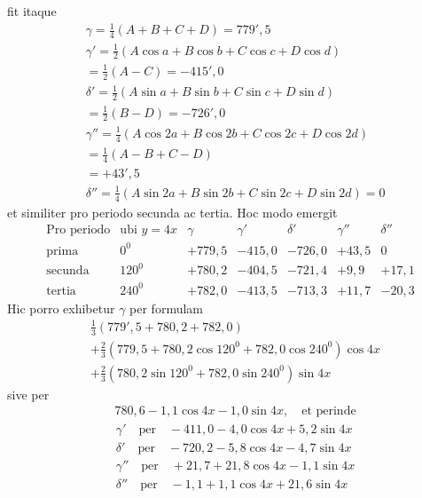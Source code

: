 fit itaque
\[
\begin{aligned}
&\gamma=\tfrac14(A+B+C+D)=779'{,}5\\[5pt]
&\gamma'=\tfrac12(A\cos a+B\cos b+C\cos c+D\cos d)\\[5pt]
&=\tfrac12(A-C)=-415'{,}0\\[5pt]
&\delta'=\tfrac12(A\sin a+B\sin b+C\sin c+D\sin d)\\[5pt]
&=\tfrac12(B-D)=-726'{,}0\\[5pt]
&\gamma''=\tfrac14(A\cos2a+B\cos2b+C\cos2c+D\cos2d)\\[5pt]
&=\tfrac14(A-B+C-D)\\[5pt]
&=+43'{,}5\\[5pt]
&\delta''=\tfrac14(A\sin2a+B\sin2b+C\sin2c+D\sin2d)=0
\end{aligned}
\]
et similiter pro periodo secunda ac tertia. Hoc modo emergit
{\small\setlength{\arraycolsep}{3pt}\[
\begin{array}{l|r|r|r|r|r|r}
\text{Pro periodo}&\text{ubi }y=4x&\gamma&\gamma'&\delta'&\gamma''&\delta''\\ \hline
\text{prima}&0^{\mathord{0}}&+779{,}5&-415{,}0&-726{,}0&+43{,}5&0\\
\text{secunda}&120^{\mathord{0}}&+780{,}2&-404{,}5&-721{,}4&+9{,}9&+17{,}1\\
\text{tertia}&240^{\mathord{0}}&+782{,}0&-413{,}5&-713{,}3&+11{,}7&-20{,}3
\end{array}
\]}
Hic porro exhibetur $\gamma$ per formulam
\[
\begin{aligned}
&\tfrac13(779'{,}5+780{,}2+782{,}0)\\[5pt]
&+\tfrac23(779{,}5+780{,}2\cos120^{\mathord{0}}+782{,}0\cos240^{\mathord{0}})\cos4x\\[5pt]
&+\tfrac23(780{,}2\sin120^{\mathord{0}}+782{,}0\sin240^{\mathord{0}})\sin4x
\end{aligned}
\]
sive per
\[
\begin{aligned}
&780{,}6-1{,}1\cos4x-1{,}0\sin4x,\quad\text{et perinde}
\end{aligned}
\]
\[
\begin{aligned}
&\gamma'\quad\text{per}\quad-411{,}0-4{,}0\cos4x+5{,}2\sin4x\\[5pt]
&\delta'\quad\text{per}\quad-720{,}2-5{,}8\cos4x-4{,}7\sin4x\\[5pt]
&\gamma''\quad\text{per}\quad+21{,}7+21{,}8\cos4x-1{,}1\sin4x\\[5pt]
&\delta''\quad\text{per}\quad-1{,}1+1{,}1\cos4x+21{,}6\sin4x
\end{aligned}
\]
